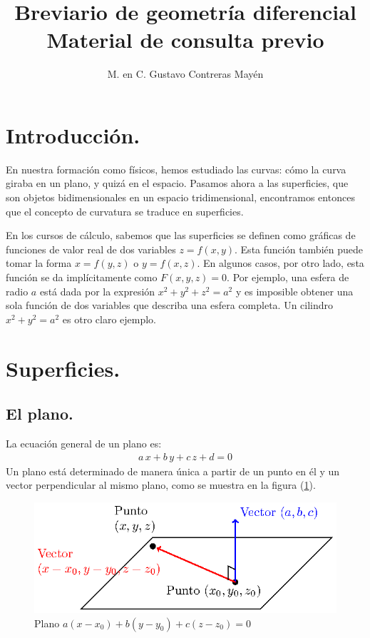 
\usepackage{apacite}
\title{Breviario de geometría diferencial \\ \large{Material de consulta previo}\vspace{-3ex}}
\author{M. en C. Gustavo Contreras Mayén}
\date{ }

\vspace{-4cm}
\maketitle
\fontsize{14}{14}\selectfont
\tableofcontents
\newpage

\section{Introducción.}

En nuestra formación como físicos, hemos estudiado las curvas: cómo la curva giraba en un plano, y quizá en el espacio. Pasamos ahora a las superficies, que son objetos bidimensionales en un espacio tridimensional, encontramos entonces que el concepto de curvatura se traduce en superficies.
\par
En los cursos de cálculo, sabemos que las superficies se definen como gráficas de funciones de valor real de dos variables $z = f (x, y)$. Esta función también puede tomar la forma $x = f (y, z)$ o $y = f (x, z)$. En algunos casos, por otro lado, esta función se da implícitamente como $F (x, y, z) = 0$. Por ejemplo, una esfera de radio $a$ está dada por la expresión $x^{2} + y^{2} + z^{2} = a^{2}$ y es imposible obtener una sola función de dos variables que describa una esfera completa. Un cilindro $x^{2} + y^{2} = a^{2}$ es otro claro ejemplo. 

\section{Superficies.}
\subsection{El plano.}

La ecuación general de un plano es:
\begin{align*}
a \, x + b \, y + c \, z + d = 0
\end{align*}
Un plano está determinado de manera única a partir de un punto en él y un vector perpendicular al mismo plano, como se muestra en la figura (\ref{fig:figura_01_plano}).
\begin{figure}[H]
    \centering
    \includegraphics[scale=1.3]{Imagenes/Superficies_01_Plano.eps}
    \caption{Plano $a(x - x_{0}) + b(y - y_{0}) + c(z -z_{0}) = 0$}
    \label{fig:figura_01_plano}
\end{figure}

